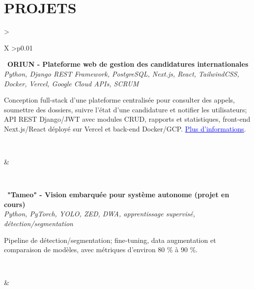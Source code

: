 \documentclass[letterpaper,10pt]{article}
\newcommand{\indentbox}[2][1em]{\hspace*{#1}\parbox{\dimexpr\linewidth-#1\relax}{#2}}
\begin{document}
\vspace{0.24cm}
\section{\textcolor{mydarkgreen}{\textbf{PROJETS}}}

  \begin{tabularx}{\textwidth}{>{\raggedright\arraybackslash}X >{\raggedleft\arraybackslash}p{0.01\textwidth}}
  
    \begin{minipage}[t]{\linewidth}\raggedright
      \textbullet\ \textbf{ORIUN - Plateforme web de gestion des candidatures internationales}\\
      \textit{\footnotesize Python, Django REST Framework, PostgreSQL, Next.js, React, TailwindCSS, Docker, Vercel, Google Cloud APIs, SCRUM}\\
      \indentbox{\footnotesize Conception full-stack d'une plateforme centralisée pour consulter des appels, soumettre des dossiers, suivre l'état d'une candidature et notifier les utilisateurs; API REST Django/JWT avec modules CRUD, rapports et statistiques, front-end Next.js/React déployé sur Vercel et back-end Docker/GCP. \href{https://github.com/JavierTarazona06/ORIUN_back}{\textcolor{blue}{\underline{Plus d'informations}}}.}\\
    \end{minipage}
    &
    \begin{minipage}[t]{\linewidth}\raggedleft %
    \end{minipage}\\

    \begin{minipage}[t]{\linewidth}\raggedright
      \textbullet\ \textbf{"Tameo" - Vision embarquée pour système autonome (projet en cours)}\\
      \textit{\footnotesize Python, PyTorch, YOLO, ZED, DWA, apprentissage supervisé, détection/segmentation}\\
      \indentbox{\footnotesize Pipeline de détection/segmentation; fine-tuning, data augmentation et comparaison de modèles, avec métriques d'environ 80 \% à 90 \%.}\\
    \end{minipage}
    &
    \begin{minipage}[t]{\linewidth}\raggedleft %
    \end{minipage}\\

  \end{tabularx}
\end{document}

